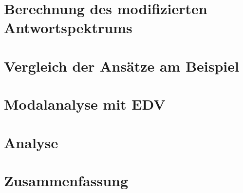 \documentclass[12pt, oneside]{report}
\begin{document}
\chapter{Berechnung des modifizierten Antwortspektrums}


\chapter{Vergleich der Ansätze am Beispiel}


\chapter{Modalanalyse mit EDV}


\chapter{Analyse}


\chapter{Zusammenfassung}


\appendix

\end{document}

